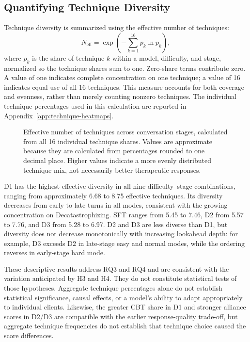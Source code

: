 \subsection{Quantifying Technique Diversity}

Technique diversity is summarized using the effective number of techniques:
\begin{equation}
N_{\mathrm{eff}} = \exp\left(-\sum_{k=1}^{16} p_k \ln p_k\right),
\label{eq:technique-diversity}
\end{equation}
where \(p_k\) is the share of technique \(k\) within a model, difficulty, and stage, normalized so the technique shares sum to one. Zero-share terms contribute zero. A value of one indicates complete concentration on one technique; a value of 16 indicates equal use of all 16 techniques. This measure accounts for both coverage and evenness, rather than merely counting nonzero techniques. The individual technique percentages used in this calculation are reported in Appendix~\ref{app:technique-heatmaps}.

\begin{figure}[H]
\centering

\caption{Effective number of techniques across conversation stages, calculated from all 16 individual technique shares. Values are approximate because they are calculated from percentages rounded to one decimal place. Higher values indicate a more evenly distributed technique mix, not necessarily better therapeutic responses.}
\label{fig:technique-diversity}
\end{figure}

D1 has the highest effective diversity in all nine difficulty--stage combinations, ranging from approximately 6.68 to 8.75 effective techniques. Its diversity decreases from early to late turns in all modes, consistent with the growing concentration on Decatastrophizing. SFT ranges from 5.45 to 7.46, D2 from 5.57 to 7.76, and D3 from 5.28 to 6.97. D2 and D3 are less diverse than D1, but diversity does not decrease monotonically with increasing lookahead depth: for example, D3 exceeds D2 in late-stage easy and normal modes, while the ordering reverses in early-stage hard mode.

These descriptive results address RQ3 and RQ4 and are consistent with the variation anticipated by H3 and H4. They do not constitute statistical tests of those hypotheses. Aggregate technique percentages alone do not establish statistical significance, causal effects, or a model's ability to adapt appropriately to individual clients. Likewise, the greater CBT share in D1 and stronger alliance scores in D2/D3 are compatible with the earlier response-quality trade-off, but aggregate technique frequencies do not establish that technique choice caused the score differences.

